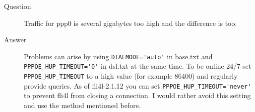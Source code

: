 \begin{description}
\item[Question] Traffic for ppp0 is several gigabytes too high and the difference
is too.
\item[Answer] Problems can arise by using \verb*?DIALMODE='auto'? in
base.txt and \verb*?PPPOE_HUP_TIMEOUT='0'? in dsl.txt at the same time.
To be online 24/7 set \verb*?PPPOE_HUP_TIMEOUT? to a high value
(for example 86400) and regularly provide queries.
As of fli4l-2.1.12 you can set \verb*?PPPOE_HUP_TIMEOUT='never'? to
prevent fli4l from closing a connection. I would rather avoid this setting and use 
the method mentioned before.
\end{description}
